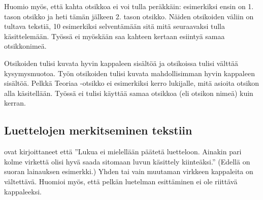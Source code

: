 \documentclass{LUT_pohja}[2016/03/09 LUT Dippa Pohja]
\begin{document}
Huomio myös, että kahta otsikkoa ei voi tulla peräkkäin: esimerkiksi ensin on 1. tason 
otsikko ja heti tämän jälkeen 2. tason otsikko. Näiden otsikoiden väliin on tultava tekstiä, 10 esimerkiksi selventämään sitä mitä seuraavaksi tulla käsittelemään. Työssä ei myöskään saa kahteen kertaan esiintyä samaa otsikkonimeä.\par

Otsikoiden tulisi kuvata  hyvin kappaleen  sisältöä  ja  otsikoissa tulisi  välttää 
kysymysmuotoa. Työn otsikoiden tulisi kuvata mahdollisimman hyvin kappaleen sisältöä. 
Pelkkä Teoriaa -otsikko ei esimerkiksi kerro lukijalle, mitä asioita otsikon alla käsitellään. Työssä ei tulisi käyttää samaa otsikkoa (eli otsikon nimeä) kuin kerran. 

\subsection{Luettelojen merkitseminen tekstiin}
\citet[s. 110]{Hirsjarvi05} ovat kirjoittaneet että ”Lukua ei mielellään päätetä luetteloon. Ainakin pari kolme virkettä olisi hyvä saada sitomaan luvun käsittely kiinteäksi.” (Edellä on suoran lainauksen esimerkki.) Yhden tai vain muutaman virkkeen kappaleita on vältettävä. Huomioi myös, että pelkän luetelman esittäminen ei ole riittävä kappaleeksi.\par
\end{document}
